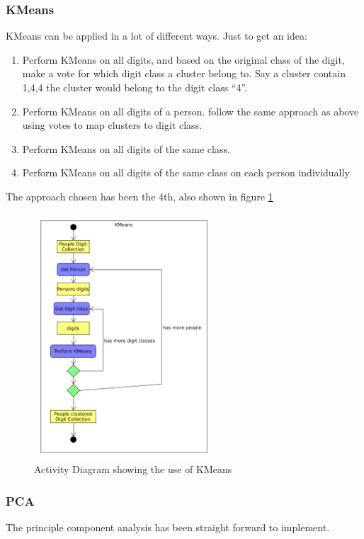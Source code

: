 \documentclass[report]{subfiles}
\begin{document}
\subsubsection{KMeans}
\label{sec:impKMeans}
KMeans can be applied in a lot of different ways.
Just to get an idea:
\begin{enumerate}
\item Perform KMeans on all digits, and based on the original class of the digit, make a vote for which digit class a cluster belong to. Say a cluster contain {1,4,4} the cluster would belong to the digit class ``4''.
\item Perform KMeans on all digits of a person. follow the same approach as above using votes to map clusters to digit class.
\item Perform KMeans on all digits of the same class.
\item Perform KMeans on all digits of the same class on each person individually
\end{enumerate}

The approach chosen has been the 4th, also shown in figure \ref{fig:kmeans}

\begin{figure}[H]
  \centering
  \includegraphics[width=0.6\textwidth]{UML/kmeans}
  \caption{Activity Diagram showing the use of KMeans}
  \label{fig:kmeans}
\end{figure}

\subsubsection{PCA}
\label{sec:impPCA}
The principle component analysis has been straight forward to implement.
\end{document}
